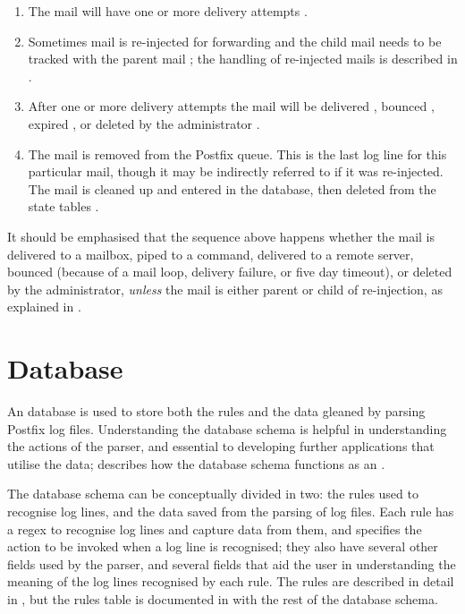 \begin{enumerate}

    \item The mail will have one or more delivery attempts
        .

    \item Sometimes mail is re-injected for forwarding and the child mail
        needs to be tracked with the parent mail ; the
        handling of re-injected mails is described in .

    \item After one or more delivery attempts the mail will be delivered
        , bounced ,
        expired , or deleted by the administrator
        .

    \item The mail is removed from the Postfix queue.  This is the last log
        line for this particular mail, though it may be indirectly referred
        to if it was re-injected.  The mail is cleaned up and entered in
        the database, then deleted from the state tables
        .

\end{enumerate}

It should be emphasised that the sequence above happens whether the mail is
delivered to a mailbox, piped to a command, delivered to a remote server,
bounced (because of a mail loop, delivery failure, or five day timeout), or
deleted by the administrator, \textit{unless\/} the mail is either parent
or child of re-injection, as explained in .

\section{Database}

\label{database}

An  database is used to store both the rules and the data
gleaned by parsing Postfix log files.  Understanding the database schema is
helpful in understanding the actions of the parser, and essential to
developing further applications that utilise the data;  describes how the database schema functions as an .

The database schema can be conceptually divided in two: the rules used to
recognise log lines, and the data saved from the parsing of log files.
Each rule has a regex to recognise log lines and capture data from them,
and specifies the action to be invoked when a log line is recognised; they
also have several other fields used by the parser, and several fields that
aid the user in understanding the meaning of the log lines recognised by
each rule.  The rules are described in detail in , but the rules table is documented in  with the rest of the database schema.

